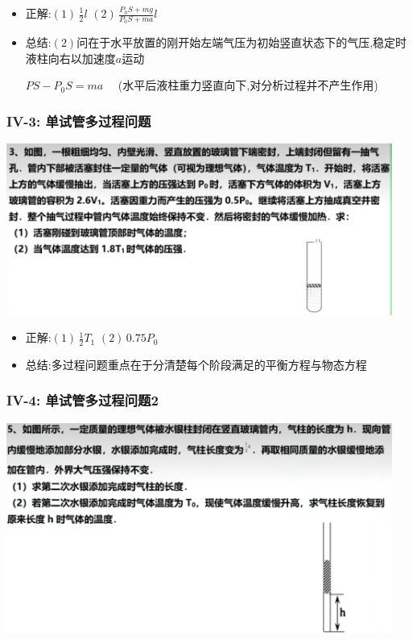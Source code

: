 \documentclass{article}
\begin{document}
\begin{itemize}
    \item 正解:\quad $(1) \, \frac{1}{2}l$  $(2) \, \frac{P_{0}S + mg}{P_{0}S + ma} l$
    \item 总结:\quad $(2)$问在于水平放置的刚开始左端气压为初始竖直状态下的气压,稳定时液柱向右以加速度$a$运动

          \hspace{3.2em}$PS - P_{0}S = ma \quad$ (水平后液柱重力竖直向下,对分析过程并不产生作用)
\end{itemize}

\vspace{2em}

\subsubsection{IV-3: 单试管多过程问题}
\includegraphics[width = 0.95\textwidth,keepaspectratio]{./pictures/2.3-14.png}

\begin{itemize}
    \item 正解:\quad $(1) \, \frac{1}{2}T_{1}$  $(2) \, 0.75P_{0}$
    \item 总结:\quad 多过程问题重点在于分清楚每个阶段满足的平衡方程与物态方程
\end{itemize}

\vspace{2em}

\subsubsection{IV-4: 单试管多过程问题2}
\includegraphics[width = 0.95\textwidth,keepaspectratio]{./pictures/2.3-15.png}
\end{document}
